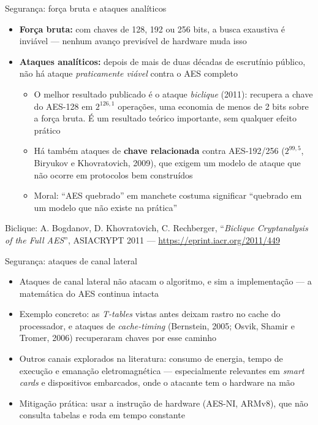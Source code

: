 \documentclass{beamer}
\begin{document}
\begin{frame}{Segurança: força bruta e ataques analíticos}

\begin{itemize}
    \footnotesize
    \item \textbf{Força bruta:} com chaves de 128, 192 ou 256 bits, a busca exaustiva é inviável --- nenhum avanço previsível de hardware muda isso

    \item \textbf{Ataques analíticos:} depois de mais de duas décadas de escrutínio público, não há ataque \textit{praticamente viável} contra o AES completo
    \begin{itemize}
        \footnotesize
        \item O melhor resultado publicado é o ataque \textit{biclique} (2011): recupera a chave do AES-128 em $2^{126,1}$ operações, uma economia de menos de 2 bits sobre a força bruta. É um resultado teórico importante, sem qualquer efeito prático
        \item Há também ataques de \textbf{chave relacionada} contra AES-192/256 ($2^{99,5}$, Biryukov e Khovratovich, 2009), que exigem um modelo de ataque que não ocorre em protocolos bem construídos
        \item Moral: ``AES quebrado'' em manchete costuma significar ``quebrado em um modelo que não existe na prática''
    \end{itemize}

\end{itemize}
{\tiny Biclique: A. Bogdanov, D. Khovratovich, C. Rechberger, ``\textit{Biclique Cryptanalysis of the Full AES}'', ASIACRYPT 2011 --- \url{https://eprint.iacr.org/2011/449}\par}

\end{frame}


\begin{frame}{Segurança: ataques de canal lateral}

\begin{itemize}
    \item {\color{red}Ataques de canal lateral não atacam o algoritmo, e sim a implementação} --- a matemática do AES continua intacta
    \item Exemplo concreto: as \textit{T-tables} vistas antes deixam rastro no cache do processador, e ataques de \textit{cache-timing} (Bernstein, 2005; Osvik, Shamir e Tromer, 2006) recuperaram chaves por esse caminho
    \item Outros canais explorados na literatura: consumo de energia, tempo de execução e emanação eletromagnética --- especialmente relevantes em \textit{smart cards} e dispositivos embarcados, onde o atacante tem o hardware na mão
    \item Mitigação prática: usar a instrução de hardware (AES-NI, ARMv8), que não consulta tabelas e roda em tempo constante
\end{itemize}

\end{frame}
\end{document}
